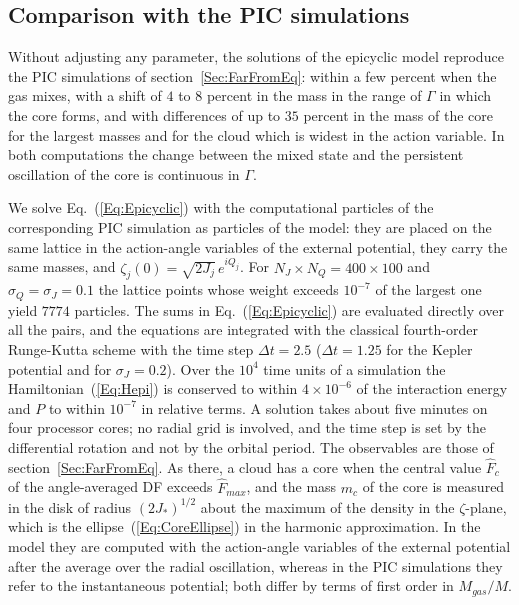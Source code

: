 \subsection{Comparison with the PIC simulations}
\label{SubSec:EpiComparison}

Without adjusting any parameter, the solutions of the epicyclic model reproduce the PIC simulations of section~\ref{Sec:FarFromEq}: within a few percent when the gas mixes, with a shift of $4$ to $8$ percent in the mass in the range of $\Gamma$ in which the core forms, and with differences of up to $35$ percent in the mass of the core for the largest masses and for the cloud which is widest in the action variable. In both computations the change between the mixed state and the persistent oscillation of the core is continuous in $\Gamma$.

We solve Eq.~(\ref{Eq:Epicyclic}) with the computational particles of the corresponding PIC simulation as particles of the model: they are placed on the same lattice in the action-angle variables of the external potential, they carry the same masses, and $\zeta_j(0) = \sqrt{2J_j}\, e^{iQ_j}$. For $N_J\times N_Q = 400\times 100$ and $\sigma_Q = \sigma_J = 0.1$ the lattice points whose weight exceeds $10^{-7}$ of the largest one yield $7774$ particles. The sums in Eq.~(\ref{Eq:Epicyclic}) are evaluated directly over all the pairs, and the equations are integrated with the classical fourth-order Runge-Kutta scheme with the time step $\Delta t = 2.5$ ($\Delta t = 1.25$ for the Kepler potential and for $\sigma_J = 0.2$). Over the $10^4$ time units of a simulation the Hamiltonian~(\ref{Eq:Hepi}) is conserved to within $4\times 10^{-6}$ of the interaction energy and $P$ to within $10^{-7}$ in relative terms. A solution takes about five minutes on four processor cores; no radial grid is involved, and the time step is set by the differential rotation and not by the orbital period. The observables are those of section~\ref{Sec:FarFromEq}. As there, a cloud has a core when the central value $\hat{F}_c$ of the angle-averaged DF exceeds $\hat{F}_{max}$, and the mass $m_c$ of the core is measured in the disk of radius $(2J_*)^{1/2}$ about the maximum of the density in the $\zeta$-plane, which is the ellipse~(\ref{Eq:CoreEllipse}) in the harmonic approximation. In the model they are computed with the action-angle variables of the external potential after the average over the radial oscillation, whereas in the PIC simulations they refer to the instantaneous potential; both differ by terms of first order in $M_{gas}/M$.

